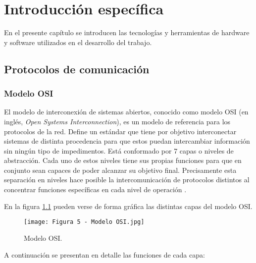\chapter{Introducción específica} %

\label{Chapter2}

En el presente capítulo se introducen las tecnologías y herramientas de hardware y software utilizados en el desarrollo del trabajo. 

\section{Protocolos de comunicación}
\subsection{Modelo OSI}

El modelo de interconexión de sistemas abiertos, conocido como modelo OSI (en inglés, \textit{Open Systems Interconnection}), es un modelo de referencia para los protocolos de la red. Define un estándar que tiene por objetivo interconectar sistemas de distinta procedencia para que estos puedan intercambiar información sin ningún tipo de impedimentos. Está conformado por 7 capas o niveles de abstracción. Cada uno de estos niveles tiene sus propias funciones para que en conjunto sean capaces de poder alcanzar su objetivo final. Precisamente esta separación en niveles hace posible la intercomunicación de protocolos distintos al concentrar funciones específicas en cada nivel de operación \citep{8}.

En la figura \ref{fig:5} pueden verse de forma gráfica las distintas capas del modelo OSI.

\begin{figure}[h]
\centering
\texttt{[image: Figura 5 - Modelo OSI.jpg]}
\caption[Modelo OSI]{Modelo OSI. \footnotemark}
\label{fig:5}
\end{figure}

A continuación se presentan en detalle las funciones de cada capa:

